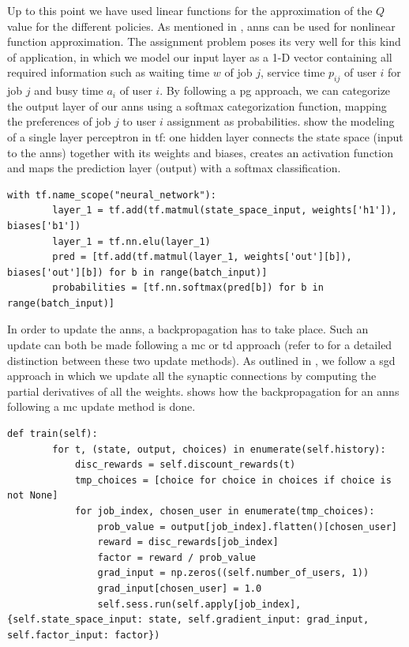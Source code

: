 \documentclass{seal_thesis}
\begin{document}
Up to this point we have used linear functions for the approximation of the $Q$ value for the different policies. As mentioned in , \glspl{ann} can be used for nonlinear function approximation. The assignment problem poses its very well for this kind of application, in which we model our input layer as a 1-D vector containing all required information such as waiting time $w$ of job $j$, service time $p_{ij}$ of user $i$ for job $j$ and busy time $a_i$ of user $i$. By following a \gls{pg} approach, we can categorize the output layer of our \glspl{ann} using a softmax categorization function, mapping the preferences of job $j$ to user $i$ assignment as probabilities.  show the modeling of a single layer perceptron in \gls{tf}: one hidden layer connects the state space (\ie input to the \glspl{ann}) together with its weights and biases, creates an activation function and maps the prediction layer (\ie output) with a softmax classification.

\begin{lstlisting}[caption=Modeling of a single perceptron in \gls{tf},label=lst:ann_1h,style=CustomPython]
	with tf.name_scope("neural_network"):
    	layer_1 = tf.add(tf.matmul(state_space_input, weights['h1']), biases['b1'])
    	layer_1 = tf.nn.elu(layer_1)
    	pred = [tf.add(tf.matmul(layer_1, weights['out'][b]), biases['out'][b]) for b in range(batch_input)]
    	probabilities = [tf.nn.softmax(pred[b]) for b in range(batch_input)]
\end{lstlisting}

In order to update the \glspl{ann}, a backpropagation has to take place. Such an update can both be made following a \gls{mc} or \gls{td} approach (refer to  for a detailed distinction between these two update methods). As outlined in , we follow a \gls{sgd} approach in which we update all the synaptic connections by computing the partial derivatives of all the weights.  shows how the backpropagation for an \glspl{ann} following a \gls{mc} update method is done.

\begin{lstlisting}[caption=Backpropagation algorithm following a \gls{mc} update approach,label=lst:mc_backpropagation,style=CustomPython]
    def train(self):
        for t, (state, output, choices) in enumerate(self.history):
            disc_rewards = self.discount_rewards(t)
            tmp_choices = [choice for choice in choices if choice is not None]
            for job_index, chosen_user in enumerate(tmp_choices):
                prob_value = output[job_index].flatten()[chosen_user]
                reward = disc_rewards[job_index]
                factor = reward / prob_value
                grad_input = np.zeros((self.number_of_users, 1))
                grad_input[chosen_user] = 1.0
                self.sess.run(self.apply[job_index], {self.state_space_input: state, self.gradient_input: grad_input, self.factor_input: factor})
\end{lstlisting}
\end{document}
